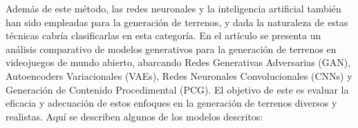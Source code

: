 \begin{itemize}
\begin{itemize}
                \end{itemize}

                Además de este método, las redes neuronales y la inteligencia artificial también han sido empleadas para la generación de terrenos, y dada la naturaleza de estas técnicas cabría clasificarlas en esta categoría. En el artículo \cite{Srivastava2024Comparative} se presenta un análisis comparativo de modelos generativos para la generación de terrenos en videojuegos de mundo abierto, abarcando Redes Generativas Adversarias (GAN), Autoencoders Variacionales (VAEs), Redes Neuronales Convolucionales (CNNs) y Generación de Contenido Procedimental (PCG). El objetivo de este es evaluar la eficacia y adecuación de estos enfoques en la generación de terrenos diversos y realistas. Aquí se describen algunos de los modelos descritos:
                

\end{itemize}
